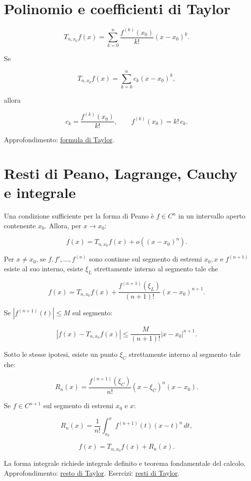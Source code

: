 \section{Polinomio e coefficienti di Taylor}\label{polinomio-e-coefficienti-di-taylor}

\[
\displaystyle
T_{n,x_0}f(x)
=
\sum_{k=0}^{n}
\frac{f^{(k)}(x_0)}{k!}(x-x_0)^k.
\]

Se

\[
\displaystyle
T_{n,x_0}f(x)=\sum_{k=0}^{n}c_k(x-x_0)^k,
\]

allora

\[
\displaystyle
c_k=\frac{f^{(k)}(x_0)}{k!},
\qquad
f^{(k)}(x_0)=k!\,c_k.
\]

Approfondimento: \href{https://ingegnerismo.it/matematica/formula-di-taylor/}{formula di Taylor}.

\section{Resti di Peano, Lagrange, Cauchy e integrale}\label{resti-di-peano-lagrange-cauchy-e-integrale}

Una condizione sufficiente per la forma di Peano è \(f\in C^n\) in un intervallo aperto contenente \(x_0\). Allora, per \(x\to x_0\):

\[
\displaystyle
f(x)=T_{n,x_0}f(x)+o((x-x_0)^n).
\]

Per \(x\ne x_0\), se \(f,f',\ldots,f^{(n)}\) sono continue sul segmento di estremi \(x_0,x\) e \(f^{(n+1)}\) esiste al suo interno, esiste \(\xi_L\) strettamente interno al segmento tale che

\[
\displaystyle
f(x)=T_{n,x_0}f(x)
+\frac{f^{(n+1)}(\xi_L)}{(n+1)!}(x-x_0)^{n+1}.
\]

Se \(|f^{(n+1)}(t)|\le M\) sul segmento:

\[
\displaystyle
|f(x)-T_{n,x_0}f(x)|
\le
\frac{M}{(n+1)!}|x-x_0|^{n+1}.
\]

Sotto le stesse ipotesi, esiste un punto \(\xi_C\) strettamente interno al segmento tale che:

\[
R_n(x)
=
\frac{f^{(n+1)}(\xi_C)}{n!}
(x-\xi_C)^n(x-x_0).
\]

Se \(f\in C^{n+1}\) sul segmento di estremi \(x_0\) e \(x\):

\[
R_n(x)
=
\frac1{n!}\int_{x_0}^{x}f^{(n+1)}(t)(x-t)^n\,dt,
\]

\[
f(x)=T_{n,x_0}f(x)+R_n(x).
\]

La forma integrale richiede integrale definito e teorema fondamentale del calcolo. Approfondimento: \href{https://ingegnerismo.it/matematica/resto-di-taylor/}{resto di Taylor}. Esercizi: \href{https://ingegnerismo.it/matematica/resti-di-taylor-esercizi/}{resti di Taylor}.


